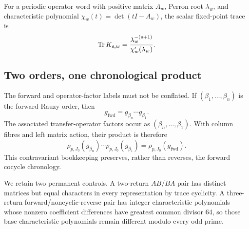 For a periodic operator word with positive matrix \(A_w\), Perron root
\(\lambda_w\), and characteristic polynomial
\(\chi_w(t)=\det(tI-A_w)\), the scalar fixed-point trace is
\begin{equation}
\operatorname{Tr} K_{s,w}
=\frac{\lambda_w^{-(s+1)}}{\chi_w'(\lambda_w)}.
\label{eq:scalaratom}
\end{equation}

\subsection{Two orders, one chronological product}

The forward and operator-factor labels must not be conflated.  If
\((\beta_1,\ldots,\beta_n)\) is the forward Rauzy order, then
\[
g_{\mathrm{fwd}}=g_{\beta_n}\cdots g_{\beta_1}.
\]
The associated transfer-operator factors occur as
\((\beta_n,\ldots,\beta_1)\).  With column fibres and left matrix action,
their product is therefore
\[
\rho_{p,J_0}(g_{\beta_n})\cdots\rho_{p,J_0}(g_{\beta_1})
=\rho_{p,J_0}(g_{\mathrm{fwd}}).
\]
This contravariant bookkeeping preserves, rather than reverses, the forward
cocycle chronology.

We retain two permanent controls.  A two-return \(AB/BA\) pair has distinct
matrices but equal characters in every representation by trace cyclicity.
A three-return forward/noncyclic-reverse pair has integer characteristic
polynomials whose nonzero coefficient differences have greatest common
divisor 64, so those base characteristic polynomials remain different modulo
every odd prime.
